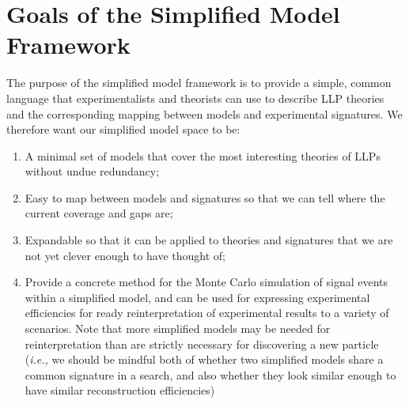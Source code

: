 \section{Goals of the Simplified Model Framework}
The purpose of the simplified model framework is to provide a simple, common language that experimentalists and theorists can use to describe LLP theories and the corresponding mapping between models and experimental signatures. We therefore want our simplified model space to be:
%
\begin{enumerate}
\item A minimal set of models that cover the most interesting theories of LLPs without undue redundancy;
\item Easy to map between models and signatures so that we can tell where the current coverage and gaps are;
\item Expandable so that it can be applied to theories and signatures that we are not yet clever enough to have thought of;
\item Provide a concrete method for the Monte Carlo simulation of signal events within a simplified model, and can be used for expressing experimental efficiencies for ready reinterpretation of experimental results to a variety of scenarios. Note that more simplified models may be needed for reinterpretation than are strictly necessary for discovering a new particle (\emph{i.e.,} we should be mindful both of whether two simplified models share a common signature in a search, and also whether they  look similar enough to have similar reconstruction efficiencies)
\end{enumerate}

